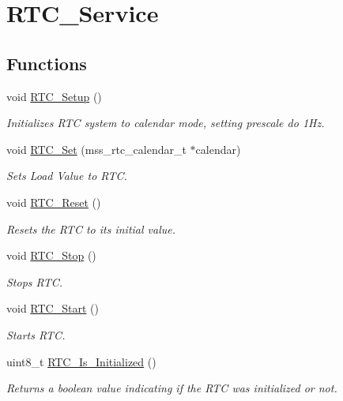 \hypertarget{group___r_t_c___service}{}\section{R\+T\+C\+\_\+\+Service}
\label{group___r_t_c___service}
\subsection*{Functions}
\begin{DoxyCompactItemize}
\item 
void \hyperlink{group___r_t_c___service_ga6f74820802592d5449a8d5fe14a662a4}{R\+T\+C\+\_\+\+Setup} ()
\begin{DoxyCompactList}\small\item\em Initializes R\+TC system to calendar mode, setting prescale do 1\+Hz. \end{DoxyCompactList}\item 
void \hyperlink{group___r_t_c___service_ga2d4f183e21b0ef653b41301d3ff215d0}{R\+T\+C\+\_\+\+Set} (mss\+\_\+rtc\+\_\+calendar\+\_\+t $\ast$calendar)
\begin{DoxyCompactList}\small\item\em Sets Load Value to R\+TC. \end{DoxyCompactList}\item 
void \hyperlink{group___r_t_c___service_ga06c8dc761f0e0779c30a4c5e17d7c1f1}{R\+T\+C\+\_\+\+Reset} ()
\begin{DoxyCompactList}\small\item\em Resets the R\+TC to its initial value. \end{DoxyCompactList}\item 
void \hyperlink{group___r_t_c___service_ga1cb35ea7ed16caaaf9f4211c76a371d5}{R\+T\+C\+\_\+\+Stop} ()
\begin{DoxyCompactList}\small\item\em Stops R\+TC. \end{DoxyCompactList}\item 
void \hyperlink{group___r_t_c___service_ga66056b41ee0e3a45023c3ce47633e058}{R\+T\+C\+\_\+\+Start} ()
\begin{DoxyCompactList}\small\item\em Starts R\+TC. \end{DoxyCompactList}\item 
uint8\+\_\+t \hyperlink{group___r_t_c___service_gaffc3970d07652e14bc2d1f0de4582bca}{R\+T\+C\+\_\+\+Is\+\_\+\+Initialized} ()
\begin{DoxyCompactList}\small\item\em Returns a boolean value indicating if the R\+TC was initialized or not. \end{DoxyCompactList}\item 

\end{DoxyCompactItemize}
